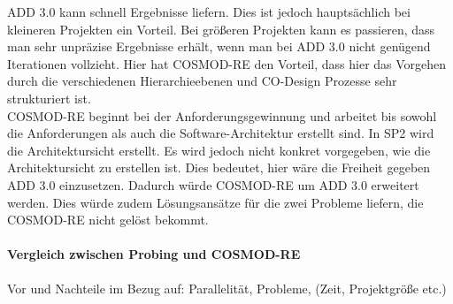 ADD 3.0 kann schnell Ergebnisse liefern. Dies ist jedoch hauptsächlich bei kleineren Projekten ein Vorteil. Bei größeren Projekten kann es passieren, dass man sehr unpräzise Ergebnisse erhält, wenn man bei ADD 3.0 nicht genügend Iterationen vollzieht. Hier hat COSMOD-RE den Vorteil, dass hier das Vorgehen durch die verschiedenen Hierarchieebenen und CO-Design Prozesse sehr strukturiert ist.\\

COSMOD-RE beginnt bei der Anforderungsgewinnung und arbeitet bis sowohl die Anforderungen als auch die Software-Architektur erstellt sind. In SP2 wird die Architektursicht erstellt. Es wird jedoch nicht konkret vorgegeben, wie die Architektursicht zu erstellen ist. Dies bedeutet, hier wäre die Freiheit gegeben ADD 3.0 einzusetzen. Dadurch würde COSMOD-RE um ADD 3.0 erweitert werden. Dies würde zudem Lösungsansätze für die zwei Probleme liefern, die COSMOD-RE nicht gelöst bekommt.\\

\paragraph{Vergleich zwischen Probing und  COSMOD-RE}
Vor und Nachteile im Bezug auf: Parallelität, Probleme, (Zeit, Projektgröße etc.)\\